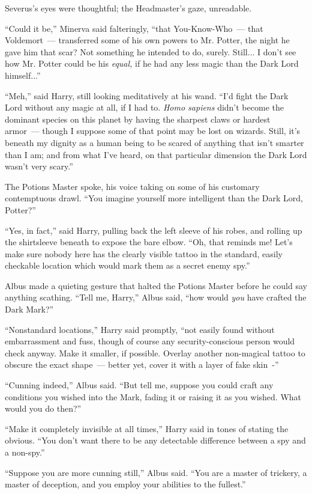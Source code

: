 Severus's eyes were thoughtful; the Headmaster's gaze, unreadable.

``Could it be,'' Minerva said falteringly, ``that You-Know-Who~--- that Voldemort~--- transferred some of his own powers to Mr. Potter, the night he gave him that scar? Not something he intended to do, surely. Still... I don't see how Mr. Potter could be his \emph{equal,} if he had any less magic than the Dark Lord himself...''

``Meh,'' said Harry, still looking meditatively at his wand. ``I'd fight the Dark Lord without any magic at all, if I had to. \emph{Homo sapiens} didn't become the dominant species on this planet by having the sharpest claws or hardest armor~--- though I suppose some of that point may be lost on wizards. Still, it's beneath my dignity as a human being to be scared of anything that isn't smarter than I am; and from what I've heard, on that particular dimension the Dark Lord wasn't very scary.''

The Potions Master spoke, his voice taking on some of his customary contemptuous drawl. ``You imagine yourself more intelligent than the Dark Lord, Potter?''

``Yes, in fact,'' said Harry, pulling back the left sleeve of his robes, and rolling up the shirtsleeve beneath to expose the bare elbow. ``Oh, that reminds me! Let's make sure nobody here has the clearly visible tattoo in the standard, easily checkable location which would mark them as a secret enemy spy.''

Albus made a quieting gesture that halted the Potions Master before he could say anything scathing. ``Tell me, Harry,'' Albus said, ``how would \emph{you} have crafted the Dark Mark?''

``Nonstandard locations,'' Harry said promptly, ``not easily found without embarrassment and fuss, though of course any security-conscious person would check anyway. Make it smaller, if possible. Overlay another non-magical tattoo to obscure the exact shape~--- better yet, cover it with a layer of fake skin~-''

``Cunning indeed,'' Albus said. ``But tell me, suppose you could craft any conditions you wished into the Mark, fading it or raising it as you wished. What would you do then?''

``Make it completely invisible at all times,'' Harry said in tones of stating the obvious. ``You don't want there to be any detectable difference between a spy and a non-spy.''

``Suppose you are more cunning still,'' Albus said. ``You are a master of trickery, a master of deception, and you employ your abilities to the fullest.''

